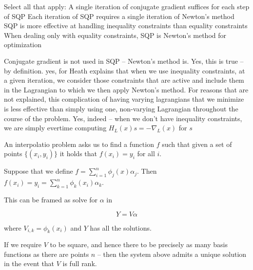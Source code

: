 \documentclass[../main.tex]{subfiles}
\begin{document}
Select all that apply:
A single iteration of conjugate gradient suffices for each step of SQP
Each iteration of SQP requires a single iteration of Newton's method
SQP is more effective at handling inequality constraints than equality constraints
When dealing only with equality constraints, SQP is Newton's method for optimization

\begin{solution}
    \begin{outline}
        \1 Conjugate gradient is not used in SQP -- Newton's method is.
        \1 Yes, this is true -- by definition.
        \1 yes, for Heath explains that when we use inequality constraints, at a given iteration, we consider those constraints that are active and include
        them in the Lagrangian to which we then apply Newton's method.
        \2 For reasons that are not explained, this complication of having varying lagrangians that we minimize is less effective than simply using one, non-varying
        Lagrangian throughout the course of the problem.
        \1 Yes, indeed -- when we don't have inequality constraints, we are simply evertime computing $H_{L}(x) s = - \nabla_{L}(x)$ for $s$
    \end{outline}
\end{solution}






\begin{definition}
    An interpolatio problem asks us to find a function $f$ such that given a set of points $\{ (x_i, y_i) \}$ it holds that $f(x_i) = y_i$ for all $i$.
\end{definition}

\begin{definition}
    Suppose that we define $f = \sum_{i=1}^{n} \phi_{j}(x) \alpha_j$. Then$f(x_i) = y_i = \sum_{k=1}^{n}\phi_{k}(x_i) \alpha_k$.

    This can be framed as solve for $\alpha$ in 

    \[
        Y = V \alpha
    \]

    where $V_{i,k} = \phi_{k}(x_i)$ and $Y$ has all the solutions.
    
    If we require $V$ to be square, and hence there to be precisely
    as many basis functions as there are points $n$ -- then the 
    system above admits a unique solution in the event that $V$ is full rank.
\end{definition}
\end{document}
